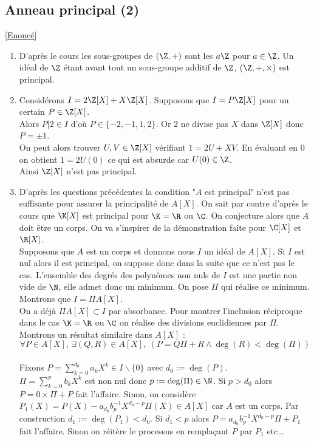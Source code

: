 \documentclass[8pt]{book}
\begin{document}
	\subsection{Anneau principal (2) }
	\label{Anneau principal (2) corrigé}
	\textcolor{blue}{\hyperref[Anneau principal (2)]{[Enoncé]}}\\
	\begin{enumerate}[leftmargin=*]
		\item D'après le cours les sous-groupes de $(\Z,+)$ sont les $a\Z$ pour $a\in \Z$. Un idéal de $\Z$ étant avant tout un sous-groupe additif de $\Z$, $(\Z,+,\times)$ est principal.
		\item Considérons $I=2\Z[X]+X\Z[X]$. Supposons que $I=P\Z[X]$ pour un certain $P\in \Z[X]$.\\
		Alors $P|2\in I$ d'où $P\in \{-2,-1,1,2\}$. Or $2$ ne divise pas $X$ dans $\Z[X]$ donc $P=\pm1$.\\
		On peut alors trouver $U,V\in \Z[X]$ vérifiant $1=2U+XV$. En évaluant en $0$ on obtient $1=2U(0)$ ce qui est absurde car $U(0)\in \Z$.\\
		Ainsi $\Z[X]$ n'est pas principal.
		\item D'après les questions précédentes la condition "$A$ est principal" n'est pas suffisante pour assurer la principalité de $A[X]$. On sait par contre d'après le cours que $\K[X]$ est principal pour $\K=\R$ ou $\C$. On conjecture alors que $A$ doit être un corps. On va s'inspirer de la démonstration faîte pour $\C[X]$ et $\R[X]$.\\
		Supposons que $A$ est un corps et donnons nous $I$ un idéal de $A[X]$. Si $I$ est nul alors il est principal, on suppose donc dans la suite que ce n'est pas le cas. L'ensemble des degrés des polynômes non nuls de $I$ est une partie non vide de $\N$, elle admet donc un minimum. On pose $\Pi$ qui réalise ce minimum. Montrons que $I=\Pi A[X]$.\\
		On a déjà $\Pi A[X]\subset I$ par absorbance. Pour montrer l'inclusion réciproque dans le cas $\K=\R$ ou $\C$ on réalise des divisions euclidiennes par $\Pi$. Montrons un résultat similaire dans $A[X]$ :\\
		$$\forall P\in A[X],\ \exists (Q,R)\in A[X],\ (P=Q\Pi+R\land\deg(R)<\deg(\Pi))$$\\
		Fixons $P=\displaystyle\sum_{k=0}^{d_0}a_kX^k\in I\backslash\{0\}$ avec $d_0:=\deg(P)$.\\
		$\Pi=\displaystyle\sum_{k=0}^pb_kX^k$ est non nul donc $p:=\deg(\Pi)\in \N$. Si $p>d_0$ alors $P=0\times\Pi+P$ fait l'affaire. Sinon, on considère $P_1(X)=P(X)-a_{d_0}b_p^{-1}X^{d_0-p}\Pi(X)\in A[X]$ car $A$ est un corps. Par construction $d_1:=\deg(P_1)<d_0$. Si $d_1<p$ alors $P=a_{d_0}b_p^{-1}X^{d_0-p}\Pi+P_1$ fait l'affaire. Sinon on réitère le processus en remplaçant $P$ par $P_1$ etc...\\

\end{enumerate}
\end{document}
